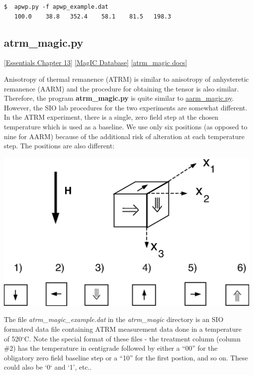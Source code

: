 \documentclass[11pt]{book}
\begin{document}
{{\begin{verbatim}
$  apwp.py -f apwp_example.dat
   100.0    38.8   352.4    58.1    81.5   198.3
\end{verbatim}


\subsection{atrm\_magic.py}
{ \href{http://earthref.org/MAGIC/books/Tauxe/Essentials/WebBook3ch13.html#ch13}{[Essentials Chapter 13]}
\href{#MagICDatabase}{[MagIC Database]}
\href{https://github.com/PmagPy/PmagPy/blob/master/programs/atrm_magic.py}{[atrm\_magic docs]}

Anisotropy of thermal  remanence (ATRM) is similar to anisotropy of anhysteretic remanence (AARM) and the procedure for obtaining the tensor is also similar.  Therefore, the program {\bf atrm\_magic.py} is quite similar to \href{#aarm_magic.py}{aarm\_magic.py}.  However, the SIO lab procedures for the two experiments are somewhat different.  In the ATRM experiment, there is a single, zero field step at the chosen temperature which is used as a baseline.  We use only six positions (as opposed to nine for AARM) because of the additional risk of alteration at each temperature step.  The positions are also different:

\includegraphics[width=15cm]{EPSFiles/atrm_meas.eps}

The file {\it atrm\_magic\_example.dat} in the {\it atrm\_magic} directory is an SIO formatred data file containing ATRM measurement data done in a temperature of 520$^{\circ}$C.   Note the special format of these files - the treatment column (column \#2) has the temperature in centigrade followed by either a ``00'' for the obligatory zero field baseline step or a ``10'' for the first postion, and so on.  These could also be `0` and `1', etc..

}}}
\end{document}

